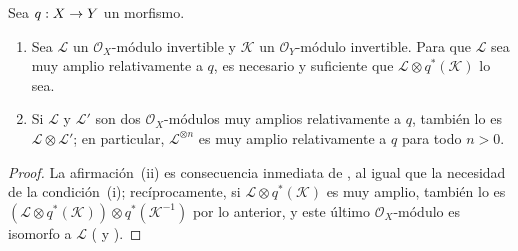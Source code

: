 \documentclass[oneside,10pt]{amsart}
\makeatletter
\newcommand{\ega@arrow}[2]{\mathchoice{#1}{#2}{#2}{#2}}
\renewcommand{\to}{\ega@arrow{\longrightarrow}{\rightarrow}}
\let\EGAOriginalLabel\label
\renewcommand{\label}[1]{\phantomsection\EGAOriginalLabel{#1}}
\makeatother
\begin{document}
\begin{corollary}[4.4.9]
\label{II.4.4.9-fr}
Sea $q:X\to Y$ un morfismo.
\begin{enumerate}
  \item Sea $\mathcal{L}$ un $\mathcal{O}_X$-módulo invertible y $\mathcal{K}$ un $\mathcal{O}_Y$-módulo invertible.
    Para que $\mathcal{L}$ sea muy amplio relativamente a $q$, es necesario y suficiente que $\mathcal{L}\otimes q^*(\mathcal{K})$ lo sea.
  \item Si $\mathcal{L}$ y $\mathcal{L}'$ son dos $\mathcal{O}_X$-módulos muy amplios relativamente a $q$, también lo es $\mathcal{L}\otimes\mathcal{L}'$;
    en particular, $\mathcal{L}^{\otimes n}$ es muy amplio relativamente a $q$ para todo $n>0$.
\end{enumerate}
\end{corollary}

\begin{proof}
La afirmación~(ii) es consecuencia inmediata de , al igual que la necesidad de la condición~(i);
recíprocamente, si $\mathcal{L}\otimes q^*(\mathcal{K})$ es muy amplio, también lo es $(\mathcal{L}\otimes q^*(\mathcal{K}))\otimes q^*(\mathcal{K}^{-1})$ por lo anterior, y este último $\mathcal{O}_X$-módulo es isomorfo a $\mathcal{L}$ ( y ).
\end{proof}
\end{document}
